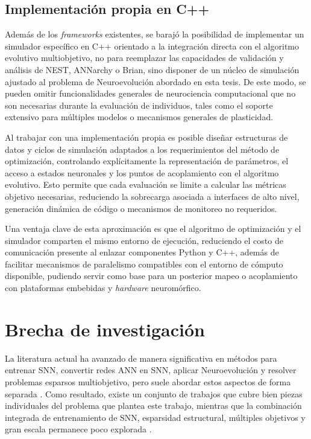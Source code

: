 \subsection{Implementación propia en C++}

Además de los \textit{frameworks} existentes, se barajó la posibilidad de implementar un simulador específico en C++ orientado a la integración directa con el algoritmo evolutivo multiobjetivo, no para reemplazar las capacidades de validación y análisis de NEST, ANNarchy o Brian, sino disponer de un núcleo de simulación ajustado al problema de Neuroevolución abordado en esta tesis. De este modo, se pueden omitir funcionalidades generales de neurociencia computacional que no son necesarias durante la evaluación de individuos, tales como el soporte extensivo para múltiples modelos o mecanismos generales de plasticidad.

Al trabajar con una implementación propia es posible diseñar estructuras de datos y ciclos de simulación adaptados a los requerimientos del método de optimización, controlando explícitamente la representación de parámetros, el acceso a estados neuronales y los puntos de acoplamiento con el algoritmo evolutivo. Esto permite que cada evaluación se limite a calcular las métricas objetivo necesarias, reduciendo la sobrecarga asociada a interfaces de alto nivel, generación dinámica de código o mecanismos de monitoreo no requeridos.

Una ventaja clave de esta aproximación es que el algoritmo de optimización y el simulador comparten el mismo entorno de ejecución, reduciendo el costo de comunicación presente al enlazar componentes Python y C++, además de facilitar mecanismos de paralelismo compatibles con el entorno de cómputo disponible, pudiendo servir como base para un posterior mapeo o acoplamiento con plataformas embebidas y \textit{hardware} neuromórfico.




\section{Brecha de investigación}
La literatura actual ha avanzado de manera significativa en métodos para entrenar SNN, convertir redes ANN en SNN, aplicar Neuroevolución y resolver problemas esparsos multiobjetivo, pero suele abordar estos aspectos de forma separada \cite{Neftci2019SurrogateGradient, Shen2024EvolutionarySNN}. Como resultado, existe un conjunto de trabajos que cubre bien piezas individuales del problema que plantea este trabajo, mientras que la combinación integrada de entrenamiento de SNN, esparsidad estructural, múltiples objetivos y gran escala permanece poco explorada \cite{Zenke2021surrogatesnn, Shen2024EvolutionarySNN, dimovska2020multiobjectiveoptimizationsizeresilience}.